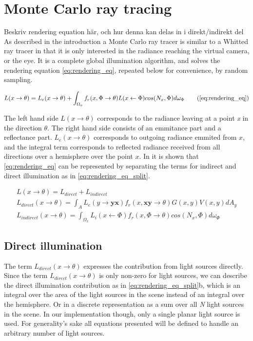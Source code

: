 \documentclass[]{report}   %
\begin{document}
\section{Monte Carlo ray tracing}
Beskriv rendering equation här, och hur denna kan delas in i direkt/indirekt del
As described in the introduction a Monte Carlo ray tracer is similar to a Whitted ray tracer in that it is only interested in the radiance reaching the virtual camera, or the eye.
It is a complete global illumination algorithm, and solves the rendering equation \autoref{eq:rendering_eq}, repeated below for convenience, by random sampling.

\begin{equation}
L(x \rightarrow \theta) = L_e(x \rightarrow \theta) + \int_{\Omega_x} f_r(x, \Phi \rightarrow \theta)L(x \leftarrow \Phi)cos(N_x, \Phi)d\omega_{\Phi}
\tag{\ref{eq:rendering_eq}}
\end{equation}

The left hand side $L(x \rightarrow \theta)$ corresponds to the radiance leaving at a point \emph{x} in the direction $\theta$.
The right hand side consists of an emmitance part and a reflectance part.
$ L_e(x \rightarrow \theta)$ corresponds to outgoing radiance emmited from $x$, and the integral term corresponds to reflected radiance received from all directions over a hemisphere over the point $x$.
In \cite{dutre} it is shown that \autoref{eq:rendering_eq} can be represented by separating the terms for indirect and direct illumination as in \autoref{eq:rendering_eq_split}.


\begin{subequations} \label{eq:rendering_eq_split}
\begin{align} 
L(x \rightarrow \theta) = L_{direct}+L_{indirect} \\
L_{direct}(x \rightarrow \theta) = \int_A L_e(y \rightarrow \mathbf{yx})f_r(x, \mathbf{xy}\rightarrow \theta)G(x,y)V(x,y)dA_y \\
L_{indirect}(x \rightarrow \theta) = \int_{\Omega_x} L_i(x \leftarrow \Phi) f_r(x, \Phi \rightarrow \theta)cos(N_x, \Phi)d\omega_{\Phi}
\end{align}
\end{subequations}

\subsection{Direct illumination}
The term $L_{direct}(x \rightarrow \theta)$ expresses the contribution from light sources directly.
Since the term $L_{direct}(x \rightarrow \theta)$ is only non-zero for light sources, we can describe the direct illumination contribution as in \autoref{eq:rendering_eq_split}b, which is an integral over the area of the light sources in the scene instead of an integral over the hemisphere.
Or in a discrete representation as a sum over all \emph{N} light sources in the scene.
In our implementation though, only a single planar light source is used.
For generality's sake all equations presented will be defined to handle an arbitrary number of light sources.
\end{document}
